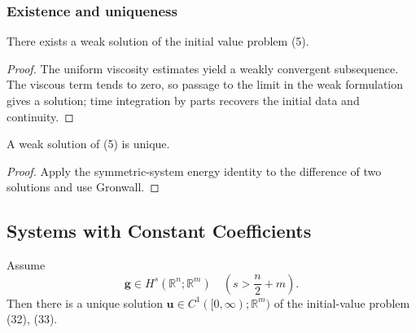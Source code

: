 \subsubsection{Existence and uniqueness}

\begin{theorem}
\label{thm:symmetric-hyperbolic-existence-weak-solution}

There exists a weak solution of the initial value problem (5).
\end{theorem}

\begin{proof}
\sketch The uniform viscosity estimates yield a weakly convergent subsequence. The viscous term tends to zero, so passage to the limit in the weak formulation gives a solution; time integration by parts recovers the initial data and continuity.
\end{proof}

\begin{theorem}
\label{thm:symmetric-hyperbolic-uniqueness-weak-solution}

A weak solution of (5) is unique.
\end{theorem}

\begin{proof}
\sketch Apply the symmetric-system energy identity to the difference of two solutions and use Gronwall.
\end{proof}

\subsection{Systems with Constant Coefficients}

\begin{theorem}
\label{thm:constant-coefficient-hyperbolic-existence}

Assume
\[
\mathbf{g} \in H^s(\mathbb{R}^n; \mathbb{R}^m) \quad \left(s > \frac{n}{2} + m\right).
\]
Then there is a unique solution $\mathbf{u} \in C^1([0, \infty); \mathbb{R}^m)$ of the initial-value problem (32), (33).
\end{theorem}

